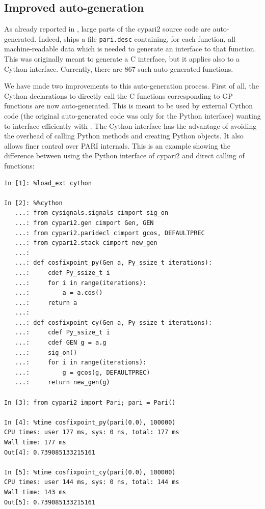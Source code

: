 \documentclass{deliverablereport}
\begin{document}
\subsection{Improved auto-generation}

As already reported in ,
large parts of the cypari2 source code are auto-generated.
Indeed, \Pari ships a file \verb/pari.desc/ containing,
for each function, all machine-readable data which is needed to generate
an interface to that function.
This was originally meant to generate a C interface,
but it applies also to a Cython interface.
Currently, there are 867 such auto-generated functions.

We have made two improvements to this auto-generation process.
First of all,
the Cython declarations to directly call the C functions
corresponding to GP functions are now auto-generated.
This is meant to be used by external Cython code
(the original auto-generated code was only for the Python interface)
wanting to interface efficiently with \Pari.
The Cython interface has the advantage of avoiding the
overhead of calling Python methods and creating Python objects.
It also allows finer control over PARI internals.
This is an example showing the difference between using
the Python interface of cypari2 and direct calling of \Pari
functions:
\begin{verbatim}
In [1]: %load_ext cython

In [2]: %%cython
   ...: from cysignals.signals cimport sig_on
   ...: from cypari2.gen cimport Gen, GEN
   ...: from cypari2.paridecl cimport gcos, DEFAULTPREC
   ...: from cypari2.stack cimport new_gen
   ...:
   ...: def cosfixpoint_py(Gen a, Py_ssize_t iterations):
   ...:     cdef Py_ssize_t i
   ...:     for i in range(iterations):
   ...:         a = a.cos()
   ...:     return a
   ...:
   ...: def cosfixpoint_cy(Gen a, Py_ssize_t iterations):
   ...:     cdef Py_ssize_t i
   ...:     cdef GEN g = a.g
   ...:     sig_on()
   ...:     for i in range(iterations):
   ...:         g = gcos(g, DEFAULTPREC)
   ...:     return new_gen(g)

In [3]: from cypari2 import Pari; pari = Pari()

In [4]: %time cosfixpoint_py(pari(0.0), 100000)
CPU times: user 177 ms, sys: 0 ns, total: 177 ms
Wall time: 177 ms
Out[4]: 0.739085133215161

In [5]: %time cosfixpoint_cy(pari(0.0), 100000)
CPU times: user 144 ms, sys: 0 ns, total: 144 ms
Wall time: 143 ms
Out[5]: 0.739085133215161
\end{verbatim}
\end{document}
